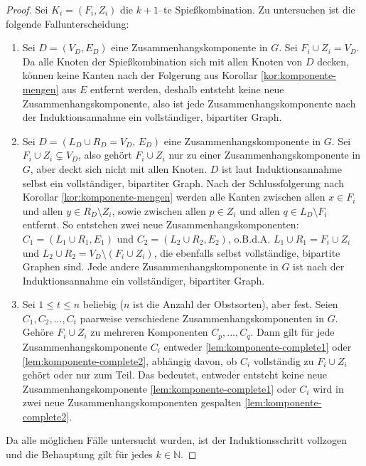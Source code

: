 \begin{proof}
Sei $K_i = (F_i, Z_i)$ die $k+1$--te Spießkombination.
Zu untersuchen ist die folgende Fallunterscheidung:
\begin{enumerate}[label={\upshape(\roman*)}]
  \item Sei $D = (V_D, E_D)$ eine Zusammenhangskomponente in $G$. Sei $F_i \cup Z_i = V_D$.
  Da alle Knoten der Spießkombination sich mit allen Knoten von $D$ decken,
  können keine Kanten nach der Folgerung aus Korollar \ref{kor:komponente-mengen} aus $E$ entfernt werden, deshalb
  entsteht keine neue Zusammenhangskomponente, also ist jede Zusammenhangskomponente
  nach der Induktionsannahme ein vollständiger, bipartiter Graph.\label{lem:komponente-complete1} 
  \item Sei $D = (L_D \cup R_D = V_D,\, E_D)$ eine Zusammenhangskomponente in $G$.
  Sei $F_i \cup Z_i \subsetneq V_D$, also gehört $F_i \cup Z_i$ nur zu einer
  Zusammenhangskomponente in $G$, aber deckt sich nicht mit allen Knoten.
  $D$ ist laut Induktionsannahme selbst ein vollständiger, bipartiter Graph.
  Nach der Schlussfolgerung nach Korollar \ref{kor:komponente-mengen} werden alle Kanten zwischen 
  allen $x \in F_i$ und allen $y \in R_D \setminus Z_i$,
  sowie zwischen allen $p \in Z_i$ und allen $q \in L_D \setminus F_i$ entfernt.
  So entstehen zwei neue Zusammenhangskomponenten: $C_1 = (L_1 \cup R_1, E_1)$ und $C_2 = (L_2 \cup R_2, E_2)$,
  o.B.d.A. $L_1 \cup R_1 = F_i \cup Z_i$ und $L_2 \cup R_2 = V_D \setminus (F_i \cup Z_i)$, die ebenfalls selbst 
  vollständige, bipartite Graphen sind.
  Jede andere Zusammenhangskomponente in $G$ ist
  nach der Induktionsannahme ein vollständiger, bipartiter Graph.\label{lem:komponente-complete2}

  \item Sei $1 \leqslant t \leqslant n$ beliebig ($n$ ist die Anzahl der Obstsorten), aber fest.
  Seien $C_1, C_2, ..., C_t$ paarweise verschiedene Zusammenhangskomponenten in $G$.
  Gehöre $F_i \cup Z_i$ zu mehreren Komponenten $C_p, ..., C_q$.
  Dann gilt für jede Zusammenhangskomponente $C_i$ entweder \ref{lem:komponente-complete1} 
  oder \ref{lem:komponente-complete2}, abhängig davon, ob $C_i$ vollständig zu $F_i \cup Z_i$
  gehört oder nur zum Teil. Das bedeutet, entweder entsteht keine neue Zusammenhangskomponente 
  \ref{lem:komponente-complete1} oder $C_i$ wird in zwei neue Zusammenhangskomponenten gespalten
  \ref{lem:komponente-complete2}.
\end{enumerate}

Da alle möglichen Fälle untersucht wurden, ist der Induktionsschritt vollzogen und die Behauptung gilt für jedes
$k \in \mathbb{N}$.
\end{proof}
